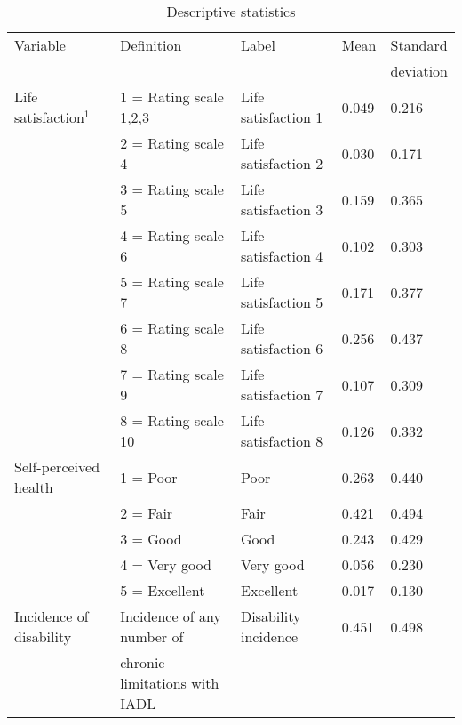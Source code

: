 \documentclass[12pt]{article}
\begin{document}
\begin{table}[h!]
\centering
\footnotesize
\caption{Descriptive statistics}
\label{desc}
\begin{tabular}{l llll}
\hline
Variable                     & Definition   & Label & Mean & Standard \\
                             &              &       &      & deviation\\\hline\hline
Life satisfaction$^{1}$      & 1 = Rating scale 1,2,3           & Life satisfaction 1   & 0.049 & 0.216 \\
                             & 2 = Rating scale 4               & Life satisfaction 2   & 0.030 & 0.171 \\
                             & 3 = Rating scale 5               & Life satisfaction 3   & 0.159 & 0.365 \\
                             & 4 = Rating scale 6               & Life satisfaction 4   & 0.102 & 0.303 \\
                             & 5 = Rating scale 7               & Life satisfaction 5   & 0.171 & 0.377 \\
                             & 6 = Rating scale 8               & Life satisfaction 6   & 0.256 & 0.437 \\
                             & 7 = Rating scale 9               & Life satisfaction 7   & 0.107 & 0.309 \\
                             & 8 = Rating scale 10              & Life satisfaction 8   & 0.126 & 0.332 \\
Self-perceived health        & 1 = Poor                         & Poor                  & 0.263 & 0.440 \\
                             & 2 = Fair                         & Fair                  & 0.421 & 0.494 \\
                             & 3 = Good                         & Good                  & 0.243 & 0.429 \\
                             & 4 = Very good                    & Very good             & 0.056 & 0.230 \\
                             & 5 = Excellent                    & Excellent             & 0.017 & 0.130 \\
Incidence of disability      & Incidence of any number of       & Disability incidence  & 0.451 & 0.498 \\      
                             & chronic limitations with IADL    &                       &       &       \\ 

\end{tabular}
\end{table}
\end{document}
